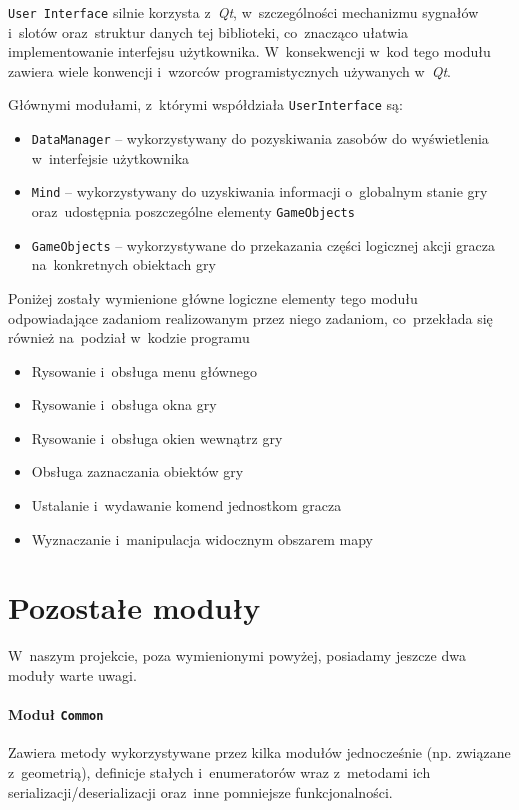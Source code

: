 \documentclass[licencjacka]{pracamgr}
\begin{document}
    \texttt{User Interface} silnie korzysta z~\emph{Qt}, w~szczególności mechanizmu sygnałów i~slotów oraz~struktur danych
    tej biblioteki, co~znacząco ułatwia implementowanie interfejsu użytkownika. W~konsekwencji w~kod tego modułu zawiera wiele
    konwencji i~wzorców programistycznych używanych w~\emph{Qt}.

    Głównymi modułami, z~którymi współdziała \texttt{UserInterface} są:
    \begin{itemize}
     \item \texttt{DataManager} -- wykorzystywany do pozyskiwania zasobów do wyświetlenia w~interfejsie użytkownika
     \item \texttt{Mind} -- wykorzystywany do uzyskiwania informacji o~globalnym stanie gry oraz~udostępnia poszczególne elementy \texttt{GameObjects}
     \item \texttt{GameObjects} -- wykorzystywane do przekazania części logicznej akcji gracza na~konkretnych obiektach gry
    \end{itemize}

    Poniżej zostały wymienione główne logiczne elementy tego modułu odpowiadające zadaniom realizowanym przez niego zadaniom,
    co~przekłada się również na~podział w~kodzie programu

    \begin{itemize}
     \item Rysowanie i~obsługa menu głównego
     \item Rysowanie i~obsługa okna gry
     \item Rysowanie i~obsługa okien wewnątrz gry
     \item Obsługa zaznaczania obiektów gry
     \item Ustalanie i~wydawanie komend jednostkom gracza
     \item Wyznaczanie i~manipulacja widocznym obszarem mapy
    \end{itemize}

  \section{Pozostałe moduły}
    W~naszym projekcie, poza wymienionymi powyżej, posiadamy jeszcze dwa moduły warte uwagi.
    \paragraph{Moduł \texttt{Common}}
      Zawiera metody wykorzystywane przez kilka modułów jednocześnie (np. związane z~geometrią), definicje stałych i~enumeratorów
      wraz z~metodami ich serializacji/deserializacji oraz~inne pomniejsze funkcjonalności.
\end{document}
